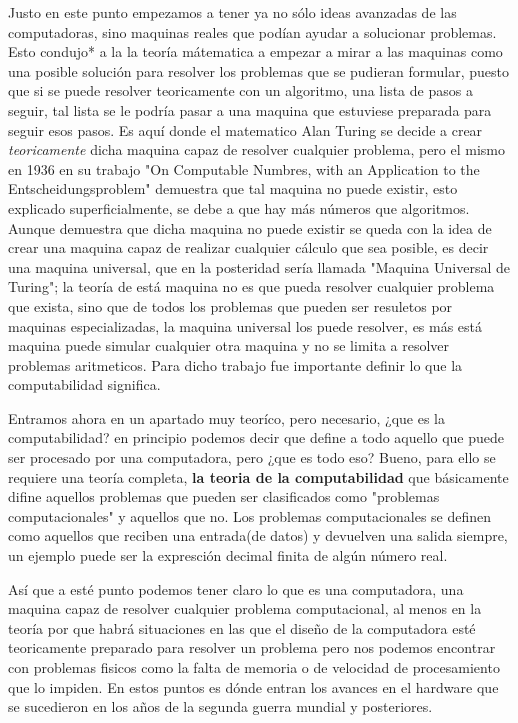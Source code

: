 \documentclass[12pt]{article}
\begin{document}
	Justo en este punto empezamos a tener ya no sólo ideas avanzadas de las computadoras, sino maquinas reales que podían ayudar a solucionar problemas. Esto condujo*   	a la la teoría mátematica a empezar a mirar a las maquinas como una posible solución
	para resolver   los problemas que se pudieran formular, puesto que si se puede resolver teoricamente con un algoritmo, una lista de pasos
	a seguir, tal lista se le podría pasar a una maquina que estuviese preparada para seguir esos pasos. Es aquí donde el matematico Alan Turing se decide a crear
	\textit{teoricamente} dicha maquina capaz de resolver cualquier problema, pero el mismo
	en 1936 en su trabajo 
	"On Computable Numbres, with an Application to the Entscheidungsproblem" demuestra que tal maquina no puede existir, esto explicado superficialmente, se debe
	a que hay más números que algoritmos. Aunque demuestra que dicha maquina no puede existir se queda con la idea de crear una maquina capaz de 	    
	realizar cualquier cálculo que sea posible,
	es decir una maquina universal, que en la posteridad sería llamada "Maquina Universal de Turing"; la teoría de está maquina no es que pueda resolver cualquier
	problema que exista, sino que de todos los problemas que pueden ser resuletos por maquinas especializadas, la maquina universal los
	puede resolver, es más está maquina puede simular cualquier otra maquina y no se limita a resolver problemas aritmeticos. Para dicho trabajo fue importante 
	definir lo que la computabilidad significa.
	
	Entramos ahora en un apartado muy teoríco, pero necesario, ¿que es la computabilidad? en principio podemos decir que define a todo aquello que puede ser 
	procesado por una computadora, pero ¿que es todo eso? Bueno, para ello se requiere una teoría completa, \textbf{la teoria de la computabilidad} que
	básicamente difine aquellos problemas que pueden ser clasificados como "problemas computacionales" y aquellos que no. Los problemas computacionales se
	definen como aquellos que reciben una entrada(de datos) y devuelven una salida siempre, un ejemplo puede ser la expresción decimal finita de algún número real.
	
	Así que a esté punto podemos tener claro lo que es una computadora, una maquina capaz de resolver cualquier problema computacional, al menos en la teoría por que
	habrá situaciones en las que el diseño de la computadora esté teoricamente preparado para resolver un problema pero nos podemos encontrar con problemas fisicos
	como la falta de memoria o de velocidad de procesamiento que lo impiden. En estos puntos es dónde entran los avances en el hardware que se sucedieron en los
	años de la segunda guerra mundial y posteriores.
	
\end{document}
